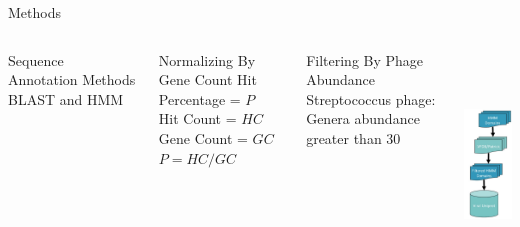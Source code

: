 \documentclass[11pt, xcolor=table]{beamer}
\begin{document}
	\begin{frame}{Methods}
	\begin{columns}
	\begin{block}{Sequence Annotation Methods}
	BLAST and HMM
	\end{block}
	
	\begin{block}{Normalizing By Gene Count}
	Hit Percentage = $P$ \\
	Hit Count = $HC$ \\
	Gene Count = $GC$ \\
	\vspace{0.3cm}
	\hspace{1.5cm}	
	$P = {HC}/{GC}$
	\end{block}
	
	\begin{block}{Filtering By Phage Abundance}
	\alert{Streptococcus} phage: \\
	Genera abundance greater than 30
	\end{block}
	
	\hspace{-2cm}
	\includegraphics[height=6cm, width=3cm]{Pipeline.png}

	\end{columns}
	\end{frame}
	
\end{document}
